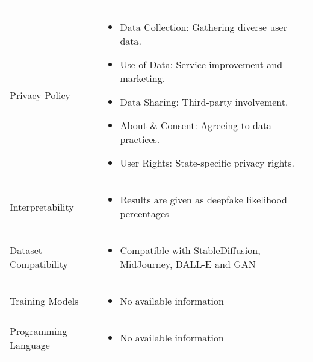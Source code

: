 \begin{table}[htpb]
\begin{tabularx}{\textwidth}{l X}
\begin{itemize}
		                               \end{itemize}                             \\
		Privacy Policy               & \begin{itemize}[nosep,nolistsep,noitemsep]
			                               \item Data Collection: Gathering diverse user data.
			                               \item Use of Data: Service improvement and marketing.
			                               \item Data Sharing: Third-party involvement.
			                               \item About \& Consent: Agreeing to data practices.
			                               \item User Rights: State-specific privacy rights.
		                               \end{itemize}                  \\
		Interpretability             & \begin{itemize}[nosep,nolistsep,noitemsep]
			                               \item Results are given as deepfake likelihood percentages
		                               \end{itemize}             \\
		Dataset Compatibility        & \begin{itemize}[nosep,nolistsep,noitemsep]
			                               \item Compatible with StableDiffusion, MidJourney, DALL-E and \ac{GAN}
		                               \end{itemize} \\
		Training Models              & \begin{itemize}[nosep,nolistsep,noitemsep]
			                               \item No available information
		                               \end{itemize}                             \\
		Programming Language         & \begin{itemize}[nosep,nolistsep,noitemsep]
			                               \item No available information
		                               \end{itemize}                             \\
		\bottomrule
	\end{tabularx}
\end{table}